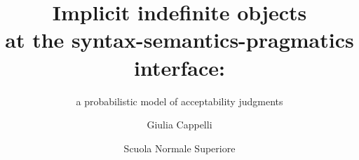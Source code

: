 \documentclass[
	fontsize=10pt, %
	twoside=true, %
	open=any, %
	numbers=noenddot, %
]{kaobook}
\begin{document}

\titlehead{}
\subject{}

\title[Implicit indefinite objects at the syntax-semantics-pragmatics interface]{Implicit indefinite objects\\ at the syntax-semantics-pragmatics interface:}
\subtitle{a probabilistic model of acceptability judgments}

\author[Giulia Cappelli]{Giulia Cappelli}


\date{Scuola Normale Superiore}

\publishers{in partial fulfillment of the requirements for the degree of Doctor of Philosophy (Ph.D.) in Linguistics}


\frontmatter %




\makeatletter
\uppertitleback{\@titlehead} %
\end{document}
